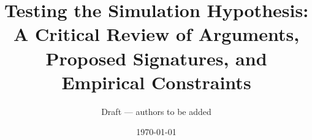 \documentclass[11pt]{article}
\title{Testing the Simulation Hypothesis:\\A Critical Review of Arguments, Proposed Signatures, and Empirical Constraints}
\author{Draft --- authors to be added}
\date{\today}
\begin{document}
\maketitle

\begin{abstract}

\end{abstract}

\tableofcontents















\end{document}
